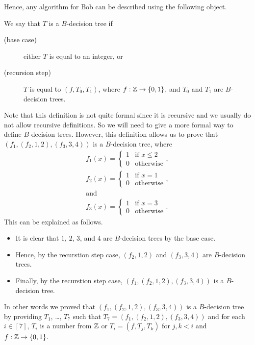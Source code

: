 Hence, any algorithm for Bob can be described using the following object.
\begin{definition}
  We say that $T$ is a $B$-decision tree if
  \begin{description}
    \item [(base case)] either $T$ is equal to an integer, or
    \item [(recursion step)] $T$ is equal to $(f, T_0, T_1)$,
      where $f : \Z \to \set{0, 1}$, and $T_0$ and $T_1$
      are $B$-decision trees.
  \end{description}
\end{definition}
Note that this definition is not quite formal since it is recursive and
we usually do not allow recursive definitions. So we will need to give a more
formal way to define $B$-decision trees. However, this definition allows us to
prove that $(f_1, (f_2, 1, 2), (f_3, 3, 4))$
is a $B$-decision tree, where
\begin{gather*}
  f_1(x) =
    \begin{cases}
      1 & \text{if } x \le 2 \\
      0 & \text{otherwise}
    \end{cases}, \\
  f_2(x) =
    \begin{cases}
      1 & \text{if } x = 1 \\
      0 & \text{otherwise}
    \end{cases}, \\
  \text{and} \\
  f_3(x) =
    \begin{cases}
      1 & \text{if } x = 3 \\
      0 & \text{otherwise}
    \end{cases}.
\end{gather*}
This can be explained as follows.
\begin{itemize}
  \item It is clear that $1$, $2$, $3$, and $4$ are $B$-decision trees by the
    base case.
  \item Hence, by the recurstion step case, $(f_2, 1, 2)$ and $(f_3, 3, 4)$
    are $B$-decision trees.
  \item Finally, by the recurstion step case, $(f_1, (f_2, 1, 2), (f_3, 3, 4))$
    is a $B$-decision tree.
\end{itemize}
In other words we proved that $(f_1, (f_2, 1, 2), (f_3, 3, 4))$
is a $B$-decision tree by providing $T_1$, \dots, $T_7$ such that
$T_7 = (f_1, (f_2, 1, 2), (f_3, 3, 4))$ and for each $i \in [7]$,
$T_i$ is a number from ${\mathbb{Z}}$ or $T_i = (f, T_j, T_k)$ for $j, k < i$ and
$f : \Z \to \set{0, 1}$.

